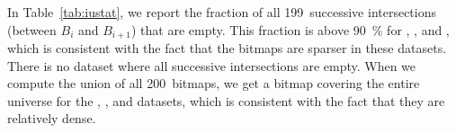 \documentclass[times]{speauth}
\begin{document}
In Table~\ref{tab:iustat}, we report the fraction of all 199~successive intersections (between $B_i$ and $B_{i+1}$)
that are empty. This fraction is above \SI{90}{\percent} for \Censeighten{}, \Censeightensrt{}, \Wikileaks{} and \Wikileakssrt{}, which is consistent with the fact that the bitmaps are sparser in these datasets. There is no dataset where all successive intersections are empty.
When we compute the union of all 200~bitmaps, we get a bitmap
covering the entire universe for the
\CensInc{}, \CensIncsrt{}, \Weather{} and \Weathersrt{} datasets, which is consistent with the fact that they are relatively dense.



\begin{table}
\caption{\label{tab:chrac}Characteristics of
our realistic datasets}
\centering


\end{table}
\end{document}
